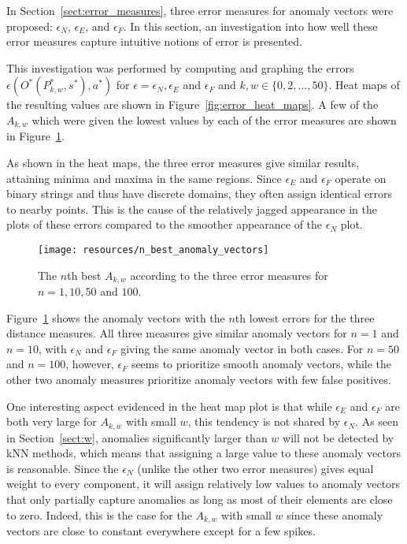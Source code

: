 In Section~\ref{sect:error_measures}, three error measures for anomaly vectors were proposed: $\epsilon_N$, $\epsilon_E$, and $\epsilon_F$. In this section, an investigation into how well these error measures capture intuitive notions of error is presented.

This investigation was performed by computing and graphing the errors \\ $\epsilon(O^*(P_{k, w}^*, s^*), a^*)$ for $\epsilon = \epsilon_N, \epsilon_E$ and $\epsilon_F$ and $k, w \in \{0,2,\dots,50\}$. Heat maps of the resulting values are shown in Figure~\ref{fig:error_heat_maps}. A few of the $A_{k, w}$ which were given the lowest values by each of the error measures are shown in Figure~\ref{fig:n_best_anomaly_vectors}.

As shown in the heat maps, the three error measures give similar results, attaining minima and maxima in the same regions. Since $\epsilon_E$ and $\epsilon_F$ operate on binary strings and thus have discrete domains, they often assign identical errors to nearby points. This is the cause of the relatively jagged appearance in the plots of these errors compared to the smoother appearance of the $\epsilon_N$ plot.

\begin{figure}[ht]
    \begin{center}
        \texttt{[image: resources/n\_best\_anomaly\_vectors]}
    \end{center}
    \caption{\small{The $n$th best $A_{k, w}$ according to the three error measures for $n = 1, 10, 50$ and $100$.}}
\label{fig:n_best_anomaly_vectors}
\end{figure}

Figure~\ref{fig:n_best_anomaly_vectors} shows the anomaly vectors with the $n$th lowest errors for the three distance measures. All three measures give similar anomaly vectors for $n = 1$ and $n = 10$, with $\epsilon_N$ and $\epsilon_F$ giving the same anomaly vector in both cases. For $n = 50$ and $n = 100$, however, $\epsilon_F$ seems to prioritize smooth anomaly vectors, while the other two anomaly measures prioritize anomaly vectors with few false positives.

One interesting aspect evidenced in the heat map plot is that while $\epsilon_E$ and $\epsilon_F$ are both very large for $A_{k,w}$ with small $w$, this tendency is not shared by $\epsilon_N$. As seen in Section~\ref{sect:w}, anomalies significantly larger than $w$ will not be detected by kNN methods, which means that assigning a large value to these anomaly vectors is reasonable. Since the $\epsilon_N$ (unlike the other two error measures) gives equal weight to every component, it will assign relatively low values to anomaly vectors that only partially capture anomalies as long as most of their elements are close to zero.  Indeed, this is the case for the $A_{k,w}$ with small $w$ since these anomaly vectors are close to constant everywhere except for a few spikes.


